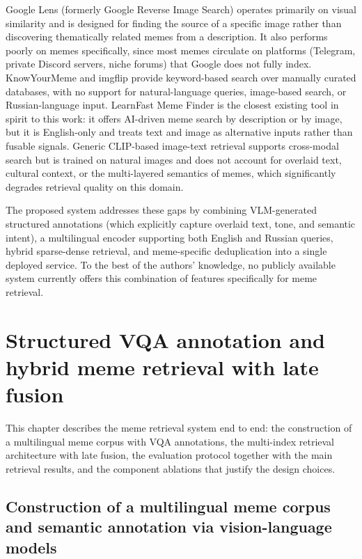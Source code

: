 \documentclass[a4paper,12pt]{article}
\begin{document}
Google Lens (formerly Google Reverse Image Search) operates primarily on visual similarity and is designed for finding the source of a specific image rather than discovering thematically related memes from a description. It also performs poorly on memes specifically, since most memes circulate on platforms (Telegram, private Discord servers, niche forums) that Google does not fully index. KnowYourMeme and imgflip provide keyword-based search over manually curated databases, with no support for natural-language queries, image-based search, or Russian-language input. LearnFast Meme Finder is the closest existing tool in spirit to this work: it offers AI-driven meme search by description or by image, but it is English-only and treats text and image as alternative inputs rather than fusable signals. Generic CLIP-based image-text retrieval supports cross-modal search but is trained on natural images and does not account for overlaid text, cultural context, or the multi-layered semantics of memes, which significantly degrades retrieval quality on this domain.

The proposed system addresses these gaps by combining VLM-generated structured annotations (which explicitly capture overlaid text, tone, and semantic intent), a multilingual encoder supporting both English and Russian queries, hybrid sparse-dense retrieval, and meme-specific deduplication into a single deployed service. To the best of the authors' knowledge, no publicly available system currently offers this combination of features specifically for meme retrieval.

\pagebreak

\section{Structured VQA annotation and hybrid meme retrieval with late fusion}
\label{sec:methods}
\label{sec:evaluation}

This chapter describes the meme retrieval system end to end: the construction of a multilingual meme corpus with VQA annotations, the multi-index retrieval architecture with late fusion, the evaluation protocol together with the main retrieval results, and the component ablations that justify the design choices.

\subsection{Construction of a multilingual meme corpus and semantic annotation via vision-language models}
\end{document}

